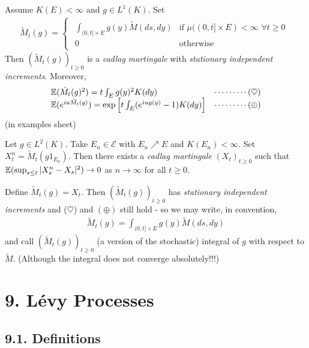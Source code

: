 \documentclass[10pt,a4paper]{report}
\begin{document}
 Assume $K(E) < \infty$ and $g\in L^1(K)$. Set
\begin{align*}
\tilde{M}_t(g) = \begin{cases}
\begin{array}{ll}
\int_{(0,t] \times E} g(y) \tilde{M} (ds,dy) & \text{if }  \mu( (0,t] \times E) < \infty \,\, \forall t\geq 0 \\
0 & \text{otherwise}
\end{array}
\end{cases}
\end{align*}
Then $(\tilde{M}_t(g))_{t\geq 0}$ is a \emph{cadlag martingale} with \emph{stationary independent increments}. Moreover,
\begin{align*}
\begin{array}{ll}
\mathbb{E}(\tilde{M}_t(g)^2) = t\int_E g(y)^2 K(dy) & \cdots\cdots\cdots (\heartsuit) \\
\mathbb{E}(e^{iu\tilde{M}_t(g)}) =\exp\Big[ t\int_E (e^{iug(y)}-1) K(dy) \Big] & \cdots\cdots\cdots (\oplus)
\end{array}
\end{align*}
(in examples sheet)
\s


 Let $g\in L^2(K)$. Take $E_n \in \mathscr{E}$ with $E_n \nearrow E$ and $K(E_n) < \infty$. Set $X_t^n = \tilde{M}_t(g1_{E_n})$. Then there exists a \emph{cadlag martingale} $(X_t)_{t\geq 0}$ such that $\mathbb{E}(\sup_{s\leq t} |X_s^n - X_s|^2) \rightarrow 0$ as $n\rightarrow \infty$ for all $t\geq 0$. 

\quad Define $\tilde{M}_t(g) = X_t$. Then $(\tilde{M}_t(g))_{t\geq 0}$ has \emph{stationary independent increments} and ($\heartsuit$) and $(\oplus)$ still hold - so we may write, in convention,
\begin{align*}
\tilde{M}_t(g) = \int_{(0,t] \times E} g(y) \tilde{M}(ds,dy)
\end{align*}
and call $(\tilde{M}_t(g))_{t\geq 0}$ (a version of the stochastic) integral of $g$ with respect to $\tilde{M}$. (Although the integral does not converge absolutely!!!)

\section*{9. L\'{e}vy Processes}

\subsection*{9.1. Definitions}
\end{document}
